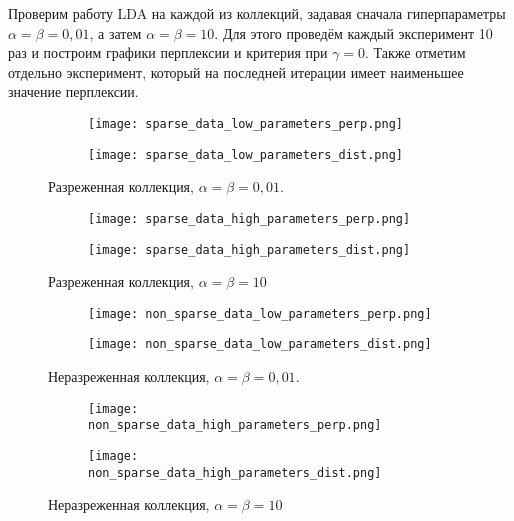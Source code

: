 \documentclass[12pt]{article}
\begin{document}
Проверим работу LDA на каждой из коллекций, задавая сначала гиперпараметры $ \alpha = \beta = 0,01 $, а затем $ \alpha = \beta = 10 $.
Для этого проведём каждый эксперимент 10 раз и построим графики перплексии и критерия при $ \gamma = 0 $.
Также отметим отдельно эксперимент, который на последней итерации имеет наименьшее значение перплексии.

\begin{figure}[hbtp]
  \centering
  \begin{subfigure}[b]{0.49\textwidth}
    \centering
    \texttt{[image: sparse\_data\_low\_parameters\_perp.png]}
  \end{subfigure}
  \begin{subfigure}[b]{0.49\textwidth}
    \centering
    \texttt{[image: sparse\_data\_low\_parameters\_dist.png]}
  \end{subfigure}
  \caption{Разреженная коллекция, $ \alpha = \beta = 0,01 $.}
  \label{fig:sparse_data_low_parameters}
\end{figure}

\begin{figure}[hbtp]
  \centering
  \begin{subfigure}[b]{0.49\textwidth}
    \centering
    \texttt{[image: sparse\_data\_high\_parameters\_perp.png]}
  \end{subfigure}
  \begin{subfigure}[b]{0.49\textwidth}
    \centering
    \texttt{[image: sparse\_data\_high\_parameters\_dist.png]}
  \end{subfigure}
  \caption{Разреженная коллекция, $ \alpha = \beta = 10 $}
  \label{fig:sparse_data_high_parameters}
\end{figure}

\begin{figure}[hbtp]
  \centering
  \begin{subfigure}[b]{0.49\textwidth}
    \centering
    \texttt{[image: non\_sparse\_data\_low\_parameters\_perp.png]}
  \end{subfigure}
  \begin{subfigure}[b]{0.49\textwidth}
    \centering
    \texttt{[image: non\_sparse\_data\_low\_parameters\_dist.png]}
  \end{subfigure}
  \caption{Неразреженная коллекция, $ \alpha = \beta = 0,01 $.}
  \label{fig:non_sparse_data_low_parameters}
\end{figure}

\begin{figure}[hbtp]
  \centering
  \begin{subfigure}[b]{0.49\textwidth}
    \centering
    \texttt{[image: non\_sparse\_data\_high\_parameters\_perp.png]}
  \end{subfigure}
  \begin{subfigure}[b]{0.49\textwidth}
    \centering
    \texttt{[image: non\_sparse\_data\_high\_parameters\_dist.png]}
  \end{subfigure}
  \caption{Неразреженная коллекция, $ \alpha = \beta = 10 $}
  \label{fig:non_sparse_data_high_parameters}
\end{figure}
\end{document}
